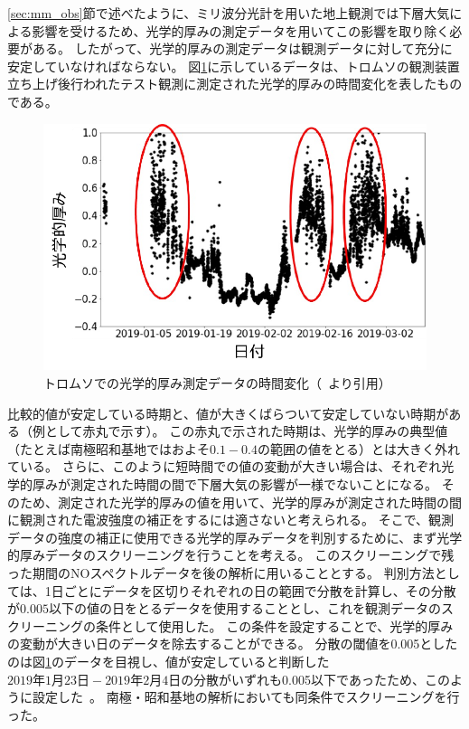 \ref{sec:mm_obs}節で述べたように、ミリ波分光計を用いた地上観測では下層大気による影響を受けるため、光学的厚みの測定データを用いてこの影響を取り除く必要がある。
したがって、光学的厚みの測定データは観測データに対して充分に安定していなければならない。
図\ref{fig:optical_depth_tromsoe}に示しているデータは、トロムソの観測装置立ち上げ後行われたテスト観測に測定された光学的厚みの時間変化を表したものである。
\begin{figure}[htbp]
    \centering
    \includegraphics[width=\linewidth]{master_thesis_contents/master_thesis_fig/optical_depth_tromsoe.pdf}
    \caption{トロムソでの光学的厚み測定データの時間変化（~\cite{goto2021bachelor}より引用）}
    \label{fig:optical_depth_tromsoe}
\end{figure}
比較的値が安定している時期と、値が大きくばらついて安定していない時期がある（例として赤丸で示す）。
この赤丸で示された時期は、光学的厚みの典型値（たとえば南極昭和基地ではおよそ$0.1-0.4$の範囲の値をとる）とは大きく外れている。
さらに、このように短時間での値の変動が大きい場合は、それぞれ光学的厚みが測定された時間の間で下層大気の影響が一様でないことになる。
そのため、測定された光学的厚みの値を用いて、光学的厚みが測定された時間の間に観測された電波強度の補正をするには適さないと考えられる。
そこで、観測データの強度の補正に使用できる光学的厚みデータを判別するために、まず光学的厚みデータのスクリーニングを行うことを考える。
このスクリーニングで残った期間のNOスペクトルデータを後の解析に用いることとする。
判別方法としては、1日ごとにデータを区切りそれぞれの日の範囲で分散を計算し、その分散が$0.005$以下の値の日をとるデータを使用することとし、これを観測データのスクリーニングの条件として使用した。
この条件を設定することで、光学的厚みの変動が大きい日のデータを除去することができる。
分散の閾値を0.005としたのは図\ref{fig:optical_depth_tromsoe}のデータを目視し、値が安定していると判断した$2019年1月23日 - 2019年2月4日$の分散がいずれも0.005以下であったため、このように設定した~\cite{goto2021bachelor}。
南極・昭和基地の解析においても同条件でスクリーニングを行った。

